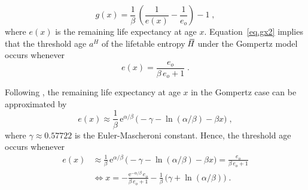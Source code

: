 \documentclass[a4paper,twoside, openright, 12pt, leqno]{article}
\newcommand*\xbar[1]{%
   \hbox{%
     \vbox{%
       \hrule height 0.5pt %
       \kern0.3ex%
       \hbox{%
         \kern-0.28em%
         \ensuremath{#1}%
         \kern-0.05em%
       }%
     }%
   }%
}
\begin{document}
\begin{equation}
g(x) = \frac{1}{\beta}\,\left(\frac{1}{e(x)}-\frac{1}{e_o}\right)-1\;,
\label{eq.gx2}
\end{equation}
%
where $e(x)$ is the remaining life expectancy at age $x$. Equation~\eqref{eq.gx2} implies that the threshold age $a^H$ of the lifetable entropy $\,\xbar{H}$ under the Gompertz model occurs whenever
\begin{equation}
e(x) = \frac{e_o}{\beta\,e_o+1}\;.
\label{eq.threshold}
\end{equation}

Following \citet{missov2013gompertz}, the remaining life expectancy at age $x$ in the Gompertz case can be approximated by
%
\begin{equation}
  e(x)\approx\frac{1}{\beta}\,\mathrm{e}^{\alpha/\beta}\,\big(-\gamma-\ln(\alpha/\beta)-\beta x\big)\;,
  \label{eq:exapprox}
\end{equation}
%
where $\gamma\approx 0.57722$ is the Euler-Mascheroni constant. Hence, the threshold age occurs whenever
%
\begin{equation*}
\begin{split}
e(x)	& \approx\frac{1}{\beta}\,\mathrm{e}^{\alpha/\beta}\,\big(-\gamma-\ln(\alpha/\beta)-\beta x\big)=\frac{e_o}{\beta\,e_o+1}			\\
& \Longleftrightarrow x=-\frac{\mathrm{e}^{-\alpha/\beta}\,e_o}{\beta\,e_o+1}-\frac{1}{\beta}\,\big(\gamma+\ln(\alpha/\beta)\big)\;.
\end{split}
\end{equation*}
\end{document}
